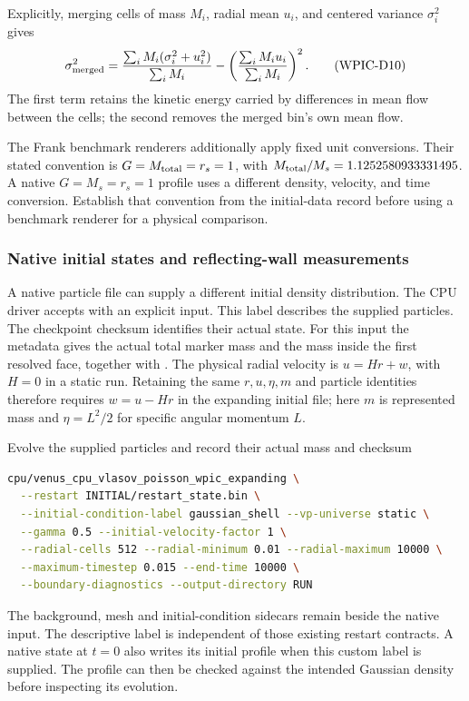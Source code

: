 Explicitly, merging cells of mass \(M_i\), radial mean \(u_i\), and centered
variance \(\sigma_i^2\) gives
\[
 \sigma_{\rm merged}^2=
 \frac{\sum_i M_i(\sigma_i^2+u_i^2)}{\sum_i M_i}
 -\left(\frac{\sum_iM_i u_i}{\sum_iM_i}\right)^2.        \tag{WPIC-D10}
\]
The first term retains the kinetic energy carried by differences in mean
flow between the cells; the second removes the merged bin's own mean flow.

The Frank benchmark renderers additionally apply fixed unit conversions.
Their stated convention is \(G=M_{\rm total}=r_s=1\), with
\(M_{\rm total}/M_s=1.1252580933331495\).  A native
\(G=M_s=r_s=1\) profile uses a different density, velocity, and time
conversion.  Establish that convention from the initial-data record before
using a benchmark renderer for a physical comparison.

\subsubsection{Native initial states and reflecting-wall measurements}

A native particle file can supply a different initial density distribution.
The CPU driver accepts  with
an explicit  input. This label describes the supplied
particles. The checkpoint checksum identifies their actual state. For this
input the metadata gives the actual total marker mass and the mass inside
the first resolved face, together with .
The physical radial velocity is \(u=Hr+w\), with \(H=0\) in a static run.
Retaining the same \(r,u,\eta,m\) and particle identities therefore requires
\(w=u-Hr\) in the expanding initial file; here \(m\) is represented mass
and \(\eta=L^2/2\) for specific angular momentum \(L\).

{}
{Evolve the supplied particles and record their actual mass and checksum}
\begin{lstlisting}[language=bash]
cpu/venus_cpu_vlasov_poisson_wpic_expanding \
  --restart INITIAL/restart_state.bin \
  --initial-condition-label gaussian_shell --vp-universe static \
  --gamma 0.5 --initial-velocity-factor 1 \
  --radial-cells 512 --radial-minimum 0.01 --radial-maximum 10000 \
  --maximum-timestep 0.015 --end-time 10000 \
  --boundary-diagnostics --output-directory RUN
\end{lstlisting}
The background, mesh and initial-condition sidecars remain beside the native
input. The descriptive label is independent of those existing restart
contracts. A native state at \(t=0\) also writes its initial profile when
this custom label is supplied. The profile can then be checked against the
intended Gaussian density before inspecting its evolution.

